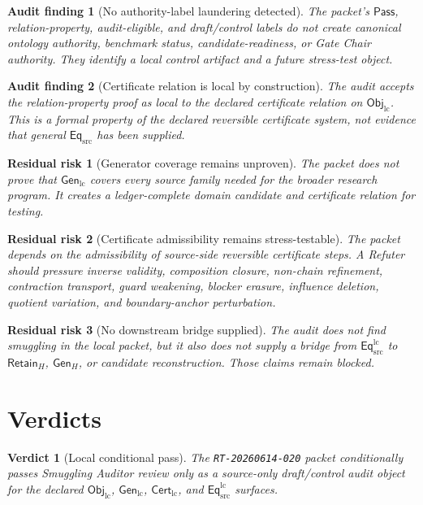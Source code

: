 \documentclass[11pt]{article}
\newcommand{\EqSrc}{\mathsf{Eq}_{\mathrm{src}}}
\newcommand{\EqLC}{\mathsf{Eq}_{\mathrm{src}}^{\mathrm{lc}}}
\newcommand{\ObjLC}{\mathsf{Obj}_{\mathrm{lc}}}
\newcommand{\GenLC}{\mathsf{Gen}_{\mathrm{lc}}}
\newcommand{\CertLC}{\mathsf{Cert}_{\mathrm{lc}}}
\newcommand{\RetainH}{\mathsf{Retain}_{H}}
\newcommand{\GenH}{\mathsf{Gen}_{H}}
\newcommand{\Pass}{\mathsf{Pass}}
\newtheorem{auditfinding}{Audit finding}
\newtheorem{residualrisk}{Residual risk}
\newtheorem{verdict}{Verdict}
\begin{document}
\begin{auditfinding}[No authority-label laundering detected]
The packet's \(\Pass\), relation-property, audit-eligible, and
draft/control labels do not create canonical ontology authority,
benchmark status, candidate-readiness, or Gate Chair authority. They
identify a local control artifact and a future stress-test object.
\end{auditfinding}

\begin{auditfinding}[Certificate relation is local by construction]
The audit accepts the relation-property proof as local to the declared
certificate relation on \(\ObjLC\). This is a formal property of the
declared reversible certificate system, not evidence that general
\(\EqSrc\) has been supplied.
\end{auditfinding}

\begin{residualrisk}[Generator coverage remains unproven]
The packet does not prove that \(\GenLC\) covers every source family
needed for the broader research program. It creates a ledger-complete
domain candidate and certificate relation for testing.
\end{residualrisk}

\begin{residualrisk}[Certificate admissibility remains stress-testable]
The packet depends on the admissibility of source-side reversible
certificate steps. A Refuter should pressure inverse validity,
composition closure, non-chain refinement, contraction transport,
guard weakening, blocker erasure, influence deletion, quotient
variation, and boundary-anchor perturbation.
\end{residualrisk}

\begin{residualrisk}[No downstream bridge supplied]
The audit does not find smuggling in the local packet, but it also does
not supply a bridge from \(\EqLC\) to \(\RetainH\), \(\GenH\), or
candidate reconstruction. Those claims remain blocked.
\end{residualrisk}

\section{Verdicts}

\begin{verdict}[Local conditional pass]
The \texttt{RT-20260614-020} packet conditionally passes Smuggling
Auditor review only as a source-only draft/control audit object for the
declared \(\ObjLC\), \(\GenLC\), \(\CertLC\), and \(\EqLC\) surfaces.
\end{verdict}
\end{document}
